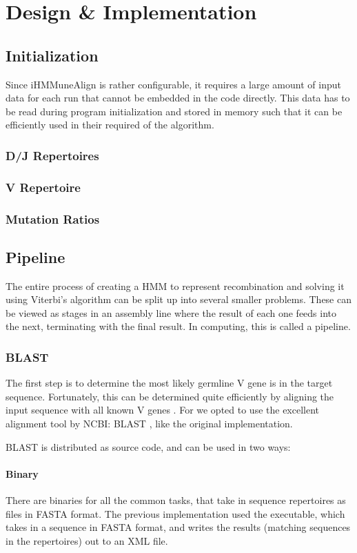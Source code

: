 \chapter{Design \& Implementation}

\section{Initialization}
Since iHMMuneAlign is rather configurable, it requires a large amount of input data for each run that cannot be embedded in the code directly. This data has to be read during program initialization and stored in memory such that it can be efficiently used in their required of the algorithm.
\subsection{D/J Repertoires}
\subsection{V Repertoire}
\subsection{Mutation Ratios}

\section{Pipeline}
The entire process of creating a HMM to represent \igh recombination and solving it using Viterbi's algorithm can be split up into several smaller problems. These can be viewed as stages in an assembly line where the result of each one feeds into the next, terminating with the final result. In computing, this is called a pipeline.

\subsection{BLAST}
The first step is to determine the most likely germline V gene is in the target sequence. Fortunately, this can be determined quite efficiently by aligning the input sequence with all known V genes \cite{IHMMuneAlign}. For we opted to use the excellent alignment tool by NCBI: BLAST \cite{blast}, like the original implementation.

BLAST is distributed as source code, and can be used in two ways:
\subsubsection{Binary}
There are binaries for all the common tasks, that take in sequence repertoires as files in FASTA \cite{fasta} format. The previous implementation used the  executable, which takes in a sequence in FASTA format, and writes the results (matching sequences in the repertoires) out to an XML file.

